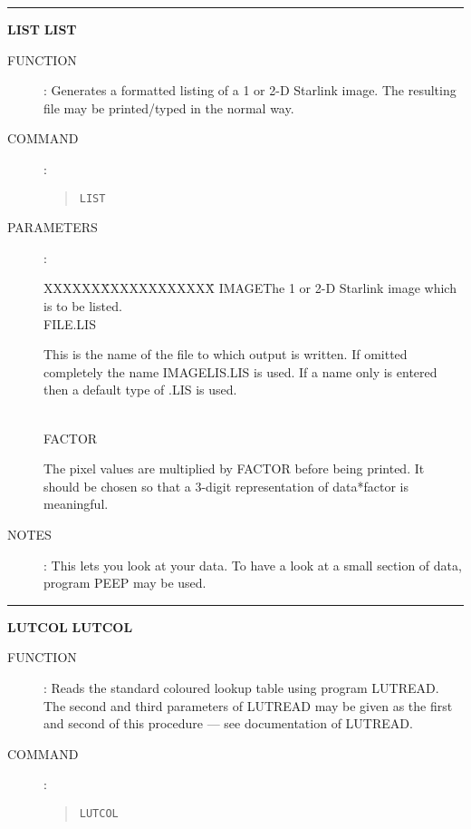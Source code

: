 \goodbreak
\rule{\textwidth}{0.3mm}
{\Large {\bf LIST} \hfill {\bf LIST}}
\begin{description}
\item [FUNCTION]:
Generates a formatted listing of a 1 or 2-D Starlink image.
The resulting file may be printed/typed in the normal way.
\item [COMMAND]:
\begin{quote}
{\tt LIST}
\end{quote}
\item [PARAMETERS] :
\begin{tabbing}
XXXXXX\=XXXXXXXXXXXX\=\kill
IMAGE\>\>The 1 or 2-D  Starlink image which is to be listed.\\
FILE\>[IMAGELIS].LIS\>\begin{minipage}[t]{100mm}
This is the name of the file to which output is written.
If omitted completely the name IMAGELIS.LIS is used.
If a name only is entered then a default type of .LIS is used.
\end{minipage}\\
FACTOR\>\begin{minipage}[t]{100mm}
The pixel values are multiplied by FACTOR before being printed.
It should be chosen so that a 3-digit representation of data*factor is
meaningful.
\end{minipage}
\end{tabbing}
\item [NOTES]:
This lets you look at your data.
To have a look at a small section of data, program PEEP may be used.
\end{description}

\goodbreak
\rule{\textwidth}{0.3mm}
{\Large {\bf LUTCOL} \hfill {\bf LUTCOL}}
\begin{description}
\item [FUNCTION]:
Reads the standard coloured lookup table using program LUTREAD.
The second and third parameters of LUTREAD may be given as the first and
second of this procedure --- see documentation of LUTREAD.
\item [COMMAND]:
\begin{quote}
{\tt LUTCOL}
\end{quote}
\end{description}

